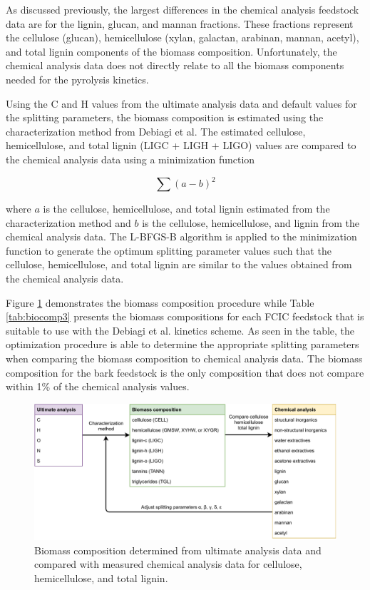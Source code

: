 \documentclass[12pt,titlepage]{article}
\begin{document}
As discussed previously, the largest differences in the chemical analysis feedstock data are for the lignin, glucan, and mannan fractions. These fractions represent the cellulose (glucan), hemicellulose (xylan, galactan, arabinan, mannan, acetyl), and total lignin components of the biomass composition. Unfortunately, the chemical analysis data does not directly relate to all the biomass components needed for the pyrolysis kinetics.

Using the C and H values from the ultimate analysis data and default values for the splitting parameters, the biomass composition is estimated using the characterization method from Debiagi et al. The estimated cellulose, hemicellulose, and total lignin (LIGC + LIGH + LIGO) values are compared to the chemical analysis data using a minimization function

\begin{equation}
    \sum (a - b)^2
\end{equation}

\noindent where $a$ is the cellulose, hemicellulose, and total lignin estimated from the characterization method and $b$ is the cellulose, hemicellulose, and lignin from the chemical analysis data. The L-BFGS-B algorithm is applied to the minimization function to generate the optimum splitting parameter values such that the cellulose, hemicellulose, and total lignin are similar to the values obtained from the chemical analysis data.

Figure \ref{fig:biocomp2} demonstrates the biomass composition procedure while Table \ref{tab:biocomp3} presents the biomass compositions for each FCIC feedstock that is suitable to use with the Debiagi et al. kinetics scheme. As seen in the table, the optimization procedure is able to determine the appropriate splitting parameters when comparing the biomass composition to chemical analysis data. The biomass composition for the bark feedstock is the only composition that does not compare within 1\% of the chemical analysis values.

\begin{figure}[H]
    \centering
    \includegraphics[width=\textwidth]{figures/biocomp2.pdf}
    \caption{Biomass composition determined from ultimate analysis data and compared with measured chemical analysis data for cellulose, hemicellulose, and total lignin.}
    \label{fig:biocomp2}
\end{figure}
\end{document}
